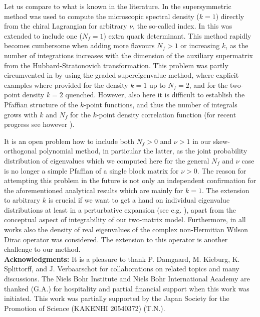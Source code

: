 \documentclass[11pt]{article}
\begin{document}
Let us compare to what is known in the literature. In \cite{DSV,ADSV}
the supersymmetric method was used to compute the microscopic spectral
density ($k=1$) directly from the chiral Lagrangian for arbitrary
$\nu$, the so-called index. In \cite{ADSVLatNf} this was extended to
include one ($N_f=1$) extra quark determinant. This method rapidly
becomes cumbersome when adding more flavours $N_f>1$ or increasing
$k$, as the number of integrations increases with the dimension of the
auxiliary supermatrix from the Hubbard-Stratonovich transformation. 
This problem was partly circumvented in \cite{SV2011} by using the graded
supereigenvalue method, where explicit examples where provided for the
density $k=1$ up to $N_f=2$, and for the two-point density $k=2$
quenched. However, also here it is difficult to establish the Pfaffian
structure of the $k$-point functions, and thus the number of integrals
grows with $k$ and $N_f$ for the $k$-point density correlation
function (for recent progress see however \cite{KV}). 

It is an open problem how to include both $N_f>0$ and $\nu>1$ in our
skew-orthogonal polynomial method, in particular the latter, as the
joint probability distribution of eigenvalues which we computed here
for the general $N_f$ and $\nu$ case is no longer a simple
Pfaffian of a single block matrix for $\nu>0$. The reason for attempting this 
problem in the future is
not only an independent confirmation for the aforementioned analytical results
which are mainly for $k=1$. The extension to arbitrary $k$ is crucial
if we want to get a hand on individual eigenvalue distributions 
at least in a perturbative expansion (see e.g. \cite{AD03}),
apart from the conceptual aspect of integrability of our two-matrix model. 
Furthermore, in all works \cite{DSV,ADSV,ADSVLatNf,SV2011} also the
density of real eigenvalues of the complex non-Hermitian Wilson Dirac
operator was considered. The extension to this operator is another
challenge to our method. 
\\


{\bf Acknowledgments:} It is a pleasure to thank P. Damgaard,
M. Kieburg, K. Splittorff, and J. Verbaarschot for collaborations on
related topics and many discussions. The Niels Bohr Institute
and Niels Bohr International Academy are thanked (G.A.) for
hospitality and partial financial support when this work was
initiated. 
This work was partially supported by the Japan Society 
for the Promotion of Science (KAKENHI 20540372) (T.N.).
\end{document}
